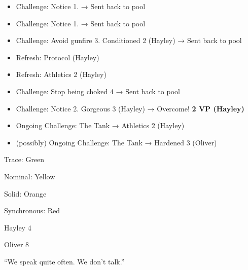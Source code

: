 {\begin{itemize}
\item Challenge: Notice 1.  → Sent back to pool
\item Challenge: Notice 1.  → Sent back to pool
\end{itemize}

\begin{itemize}
\item Challenge: Avoid gunfire 3. Conditioned 2 (Hayley) → Sent back to pool
\item Refresh: Protocol (Hayley)
\item Refresh: Athletics 2 (Hayley)
\item Challenge: Stop being choked 4 → Sent back to pool
\item Challenge: Notice 2. Gorgeous 3 (Hayley) → Overcome! \textbf{2 VP (Hayley)} 
\end{itemize}
}



\begin{itemize}
\item Ongoing Challenge: The Tank → Athletics 2 (Hayley)
\item (possibly) Ongoing Challenge: The Tank → Hardened 3 (Oliver)
\end{itemize}




{
\parskip=0pt
Trace: Green

Nominal: Yellow

Solid: Orange

Synchronous: Red
}



Hayley 4

Oliver 8








``We speak quite often.  We don't talk.''






